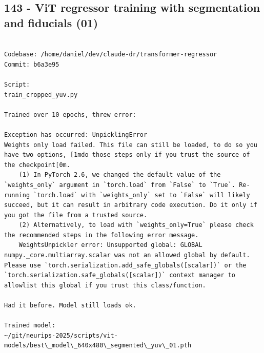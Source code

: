 \subsection{143 - ViT regressor training with segmentation and fiducials (01)}
\label{app_res:143}

\begin{verbatim}

Codebase: /home/daniel/dev/claude-dr/transformer-regressor 
Commit: b6a3e95

Script:
train_cropped_yuv.py

Trained over 10 epochs, threw error:

Exception has occurred: UnpicklingError
Weights only load failed. This file can still be loaded, to do so you have two options, [1mdo those steps only if you trust the source of the checkpoint[0m. 
	(1) In PyTorch 2.6, we changed the default value of the `weights_only` argument in `torch.load` from `False` to `True`. Re-running `torch.load` with `weights_only` set to `False` will likely succeed, but it can result in arbitrary code execution. Do it only if you got the file from a trusted source.
	(2) Alternatively, to load with `weights_only=True` please check the recommended steps in the following error message.
	WeightsUnpickler error: Unsupported global: GLOBAL numpy._core.multiarray.scalar was not an allowed global by default. Please use `torch.serialization.add_safe_globals([scalar])` or the `torch.serialization.safe_globals([scalar])` context manager to allowlist this global if you trust this class/function.

Had it before. Model still loads ok.

Trained model:
~/git/neurips-2025/scripts/vit-models/best\_model\_640x480\_segmented\_yuv\_01.pth

\end{verbatim}



